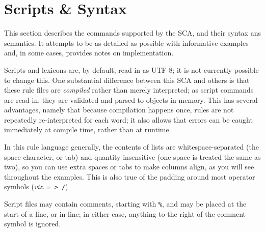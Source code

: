 \documentclass[10pt,letterpaper]{article}
\begin{document}


\section{Scripts \& Syntax}
\label{prt:scripts_and_syntax}
This section describes the commands supported by the SCA, and their syntax ans semantics. It attempts to be as detailed as possible with informative examples and, in some cases, provides notes on implementation.

Scripts and lexicons are, by default, read in as UTF-8; it is not currently possible to change this. One substantial difference between this SCA and others is that these rule files are \emph{compiled} rather than merely interpreted; as script commands are read in, they are validated and parsed to objects in memory. This has several advantages, namely that because compilation happens once, rules are not repeatedly re-interpreted for each word; it also allows that errors can be caught immediately at compile time, rather than at runtime.

In this rule language generally, the contents of lists are whitespace-separated (the space character, or tab) and quantity-insensitive (one space is treated the same as two), so you can use extra spaces or tabs to make columns align, as you will see throughout the examples. This is also true of the padding around most operator symbols (\emph{viz.} \texttt{= > /})


Script files may contain comments, starting with \texttt{\%}, and may be placed at the start of a line, or in-line; in either case, anything to the right of the comment symbol is ignored.
\end{document}
